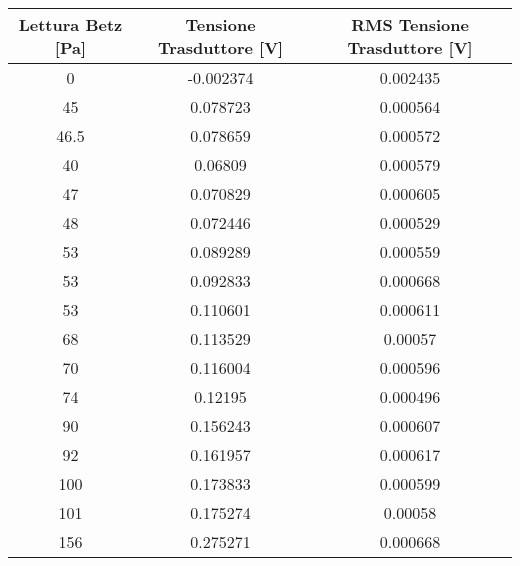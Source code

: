 \begin{table}[h]
\centering
\begin{tabular}{|c|c|c|}
\hline
Lettura Betz {[}Pa{]} & Tensione Trasduttore {[}V{]} & RMS Tensione Trasduttore {[}V{]} \\ \hline
0                     & -0.002374                    & 0.002435                         \\ \hline
45                    & 0.078723                     & 0.000564                         \\ \hline
46.5                  & 0.078659                     & 0.000572                         \\ \hline
40                    & 0.06809                      & 0.000579                         \\ \hline
47                    & 0.070829                     & 0.000605                         \\ \hline
48                    & 0.072446                     & 0.000529                         \\ \hline
53                    & 0.089289                     & 0.000559                         \\ \hline
53                    & 0.092833                     & 0.000668                         \\ \hline
53                    & 0.110601                     & 0.000611                         \\ \hline
68                    & 0.113529                     & 0.00057                          \\ \hline
70                    & 0.116004                     & 0.000596                         \\ \hline
74                    & 0.12195                      & 0.000496                         \\ \hline
90                    & 0.156243                     & 0.000607                         \\ \hline
92                    & 0.161957                     & 0.000617                         \\ \hline
100                   & 0.173833                     & 0.000599                         \\ \hline
101                   & 0.175274                     & 0.00058                          \\ \hline
156                   & 0.275271                     & 0.000668                         \\ \hline

\end{tabular}
\end{table}
